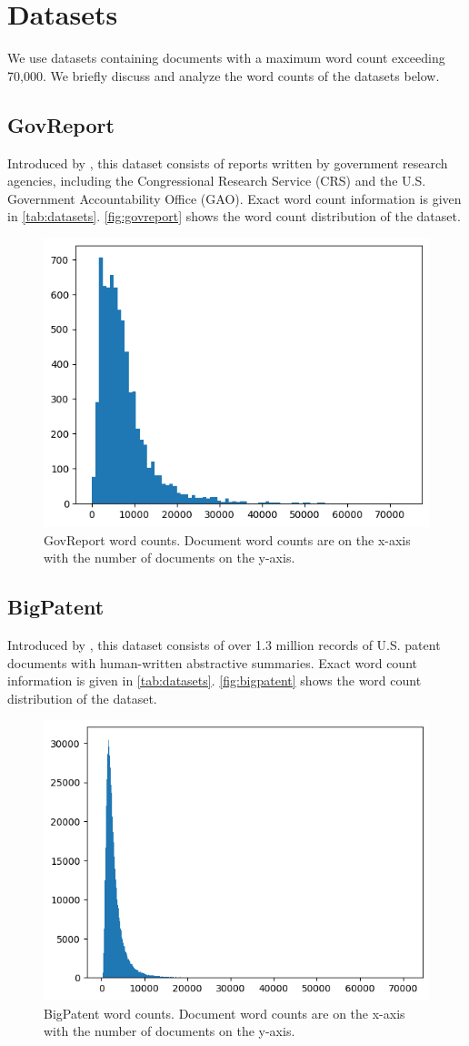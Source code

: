\section{Datasets}
\label{sec:datasets}

We use datasets containing documents with a maximum word count exceeding 70,000.
We briefly discuss and analyze the word counts of the datasets below.


\subsection*{GovReport}

Introduced by \citet{huang-etal-2021-efficient}, this dataset consists of reports written by government research agencies, including the Congressional Research Service (CRS) and the U.S. Government Accountability Office (GAO).
Exact word count information is given in \autoref{tab:datasets}.
\autoref{fig:govreport} shows the word count distribution of the dataset.

\begin{figure}[!ht]
  \centering
  \includegraphics[width=.48\textwidth]{images/govreport-wordcount.png}
  \caption{
    GovReport word counts.
    Document word counts are on the x-axis with the number of documents on the y-axis.
  }
  \label{fig:govreport}
\end{figure}


\subsection*{BigPatent}

Introduced by \citet{sharma-etal-2019-bigpatent}, this dataset consists of over 1.3 million records of U.S. patent documents with human-written abstractive summaries.
Exact word count information is given in \autoref{tab:datasets}.
\autoref{fig:bigpatent} shows the word count distribution of the dataset.

\begin{figure}[!ht]
  \centering
  \includegraphics[width=.48\textwidth]{images/bigpatent-wordcount.png}
  \caption{
    BigPatent word counts.
    Document word counts are on the x-axis with the number of documents on the y-axis.
  }
  \label{fig:bigpatent}
\end{figure}


